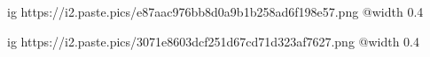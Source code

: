 
 
 
 
 

\ifcmt
	ig https://i2.paste.pics/e87aac976bb8d0a9b1b258ad6f198e57.png
	@width 0.4
\fi

\ifcmt
	ig https://i2.paste.pics/3071e8603dcf251d67cd71d323af7627.png
	@width 0.4
\fi
